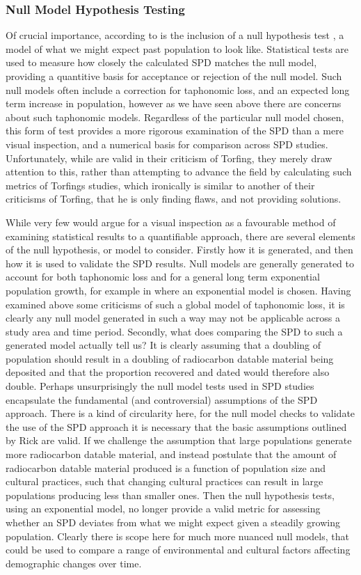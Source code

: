 \subsubsection{Null Model Hypothesis Testing}
Of crucial importance, according to \citet{Timpson2015199} is the inclusion of a null hypothesis test \citep[200]{Timpson2015199}, a model of what we might expect past population to look like. Statistical tests are used to measure how closely the calculated SPD matches the null model, providing a quantitive basis for acceptance or rejection of the null model. Such null models often include a correction for taphonomic loss, and an expected long term increase in population, however as we have seen above there are concerns about such taphonomic models. Regardless of the particular null model chosen, this form of test provides a more rigorous examination of the SPD than a mere visual inspection, and a numerical basis for comparison across SPD studies. Unfortunately, while \citet{Timpson2015199} are valid in their criticism of Torfing, they merely draw attention to this, rather than attempting to advance the field by calculating such metrics of Torfings studies, which ironically is similar to another of their criticisms of Torfing, that he is only finding flaws, and not providing solutions.

While very few would argue for a visual inspection as a favourable method of examining statistical results to a quantifiable approach, there are several elements of the null hypothesis, or model to consider. Firstly how it is generated, and then how it is used to validate the SPD results. Null models are generally generated to account for both taphonomic loss and for a general long term exponential population growth, for example in \citet{TIMPSON2014549} where an exponential model is chosen. Having examined above some criticisms of such a global model of taphonomic loss, it is clearly any null model generated in such a way may not be applicable across a study area and time period. Secondly, what does comparing the SPD to such a generated model actually tell us? It is clearly assuming that a doubling of population should result in a doubling of radiocarbon datable material being deposited and that the proportion recovered and dated would therefore also double. Perhaps unsurprisingly the null model tests used in SPD studies encapsulate the fundamental (and controversial) assumptions of the SPD approach. There is a kind of circularity here, for the null model checks to validate the use of the SPD approach it is necessary that the basic assumptions outlined by Rick are valid. If we challenge the assumption that large populations generate more radiocarbon datable material, and instead postulate that the amount of radiocarbon datable material produced is a function of population size and cultural practices, such that changing cultural practices can result in large populations producing less than smaller ones. Then the null hypothesis tests, using an exponential model, no longer provide a valid metric for assessing whether an SPD deviates from what we might expect given a steadily growing population. Clearly there is scope here for much more nuanced null models, that could be used to compare a range of environmental and cultural factors affecting demographic changes over time.

